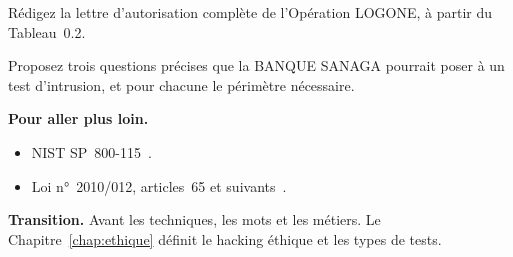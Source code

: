 \begin{boxexo}[title={\ding{45}\quad Exercice~0.9. Une lettre \niveauexpert}]
Rédigez la lettre d'autorisation complète de l'Opération LOGONE, à partir
du Tableau~0.2.
\end{boxexo}

\begin{boxexo}[title={\ding{45}\quad Exercice~0.10. La question \niveauexpert}]
Proposez trois questions précises que la BANQUE SANAGA pourrait poser à un
test d'intrusion, et pour chacune le périmètre nécessaire.
\end{boxexo}

\bigskip

\begin{boxinfo}
\textbf{Pour aller plus loin.}
\begin{itemize}
    \item NIST SP~800-115~\cite{nist800115}.
    \item Loi n°~2010/012, articles~65 et suivants~\cite{loi2010012}.
\end{itemize}
\end{boxinfo}

\begin{boxinfo}
\textbf{Transition.} Avant les techniques, les mots et les métiers. Le
Chapitre~\ref{chap:ethique} définit le hacking éthique et les types de
tests.
\end{boxinfo}
